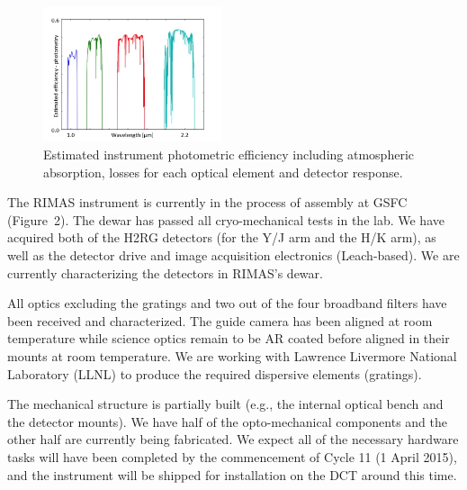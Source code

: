 \documentclass[letterpaper,11pt]{article}
\begin{document}
\begin{figure}[tp!]
\begin{center}
\includegraphics[width=0.47\textwidth]{figures/slide5.jpg}
\vspace{-0.7cm}
\end{center}
\caption{\footnotesize
{ Estimated instrument photometric efficiency including atmospheric absorption, losses for each optical element and detector response. }}
\label{fig2}
\end{figure}

\smallskip

The RIMAS instrument is currently in the process of assembly at GSFC (Figure~2).
The dewar has passed all cryo-mechanical tests in the lab.  We have acquired both of the H2RG detectors (for the Y/J 
arm and the H/K arm), as well as the detector drive and image acquisition electronics
(Leach-based).  We are currently characterizing the detectors in RIMAS's dewar.

All optics excluding the gratings and two out of the four broadband filters have been received and characterized.  
The guide camera has been aligned at room temperature while science optics remain to be AR 
coated before aligned in their mounts at room temperature. We are working with Lawrence Livermore 
National Laboratory (LLNL) to produce the required dispersive elements (gratings).  

The mechanical structure is partially built (e.g., the internal optical bench and 
the detector mounts).  We have half of the opto-mechanical components and the other half 
are currently being fabricated.   We expect all of the necessary 
hardware tasks will have been completed by the commencement of Cycle 11 (1 April 2015), 
and the instrument will be shipped for installation on the DCT around this time.
\end{document}
